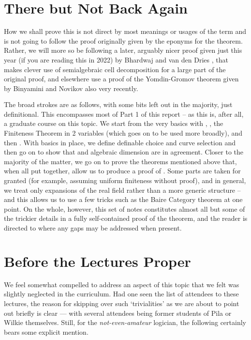 \section{There but Not Back Again}

How we shall prove this is not direct by most meanings or usages of the term and is not going to follow the proof originally given by the eponyms for the theorem. Rather, we will more so be following a later, arguably nicer proof given just this year (if you are reading this in 2022) by Bhardwaj and van den Dries \cite{bhardwaj_pilawilkie_2022}, that makes clever use of semialgebraic cell decomposition for a large part of the original proof, and elsewhere use a proof of the Yomdin-Gromov theorem given by Binyamini and Novikov \cite{binyamini_yomdingromov_2021} also very recently.

The broad strokes are as follows, with some bits left out in the majority, just definitional. This encompasses most of Part 1 of this report -- as this is, after all, a graduate course on this topic. We start from the very basics with , \omy, the Finiteness Theorem in 2 variables (which goes on to be used more broadly), and then \cds. With basics in place, we define definable choice and curve selection and then go on to show that  and algebraic dimension are in agreement. Closer to the majority of the matter, we go on to prove the theorems mentioned above that, when all put together, allow us to produce a proof of \pw. Some parts are taken for granted (for example, assuming uniform finiteness without proof), and in general, we treat only expansions of the real field rather than a more generic structure -- and this allows us to use a few tricks such as the Baire Category theorem at one point. On the whole, however, this set of notes constitutes almost all but some of the trickier details in a fully self-contained proof of the \pw theorem, and the reader is directed to where any gaps may be addressed when present.


\section{Before the Lectures Proper}
We feel somewhat compelled to address an aspect of this topic that we felt was slightly neglected in the curriculum. Had one seen the list of attendees to these lectures, the reason for skipping over such `trivialities' as we are about to point out briefly is clear — with several attendees being former students of Pila or Wilkie themselves. Still, for the \emph{not-even-amateur} logician, the following certainly bears some explicit mention.

